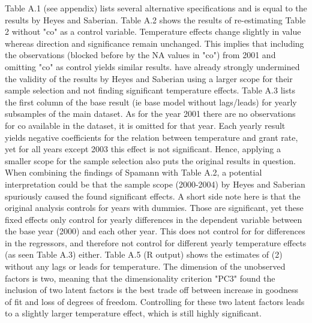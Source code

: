 \documentclass[11pt]{article}
\begin{document}
	Table A.1 (see appendix) lists several alternative specifications and is equal to the results by Heyes and Saberian.
	Table A.2 shows the results of re-estimating Table 2 without "co" as a control variable. Temperature effects change slightly in value whereas direction and significance remain unchanged. This implies that including the observations (blocked before by the NA values in "co") from 2001 and omitting "co" as control yields similar results.
	\newline \cite{Spamann.2020} have already strongly undermined the validity of the results by Heyes and Saberian using a larger scope for their sample selection and not finding significant temperature effects. Table A.3 lists the first column of the base result (ie base model without lags/leads) for yearly subsamples of the main dataset. As for the year 2001 there are no observations for co available in the dataset, it is omitted for that year. Each yearly result yields negative coefficients for the relation between temperature and grant rate, yet for all years except 2003 this effect is not significant. Hence, applying a smaller scope for the sample selection also puts the original results in question. When combining the findings of Spamann with Table A.2, a potential interpretation could be that the sample scope (2000-2004) by Heyes and Saberian spuriously caused the found significant effects.
	A short side note here is that the original analysis controls for years with dummies. Those are significant, yet these fixed effects only control for yearly differences in the dependent variable between the base year (2000) and each other year. This does not control for for differences in the regressors, and therefore not control for different yearly temperature effects (as seen Table A.3) either.
	Table A.5 (R output) shows the estimates of (2) without any lags or leads for temperature. The dimension of the unobserved factors is two, meaning that the dimensionality criterion "PC3" found the inclusion of two latent factors is the best trade off between increase in goodness of fit and loss of degrees of freedom. Controlling for these two latent factors leads to a slightly larger temperature effect, which is still highly significant.
\end{document}
